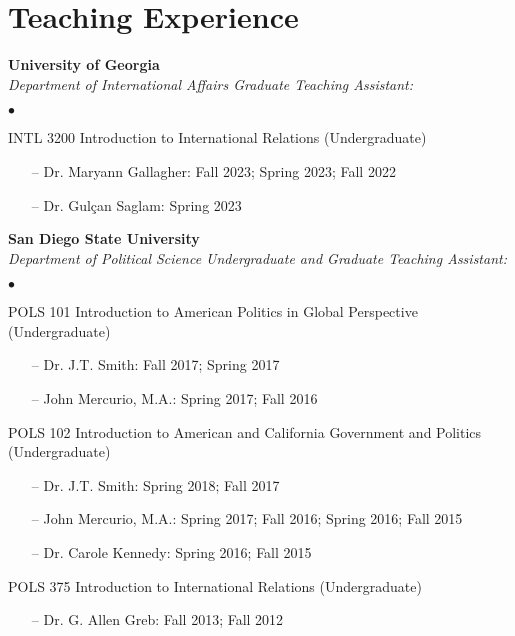 \documentclass[letterpaper,12pt]{article}
\newenvironment{list2}{
  \begin{list}{$\bullet$}{%
      \setlength{\itemsep}{0in}
      \setlength{\parsep}{0in} \setlength{\parskip}{0in}
      \setlength{\topsep}{0in} \setlength{\partopsep}{0in} 
      \setlength{\leftmargin}{0.5in}}}{\end{list}}
\begin{document}
\section{Teaching Experience}
\textbf{University of Georgia}\\
\textit{Department of International Affairs Graduate Teaching Assistant:}
\begin{list2}
    \item INTL 3200 Introduction to International Relations (Undergraduate)
        \begin{itemize}
            \item[--] Dr. Maryann Gallagher: Fall 2023; Spring 2023; Fall 2022
            \item[--] Dr. Gulçan Saglam: Spring 2023
        \end{itemize}
\end{list2}
\par
\textbf{San Diego State University}\\
\textit{Department of Political Science Undergraduate and Graduate Teaching Assistant:}
\begin{list2}
    \item POLS 101 Introduction to American Politics in Global Perspective (Undergraduate)
        \begin{itemize}
            \item[--] Dr. J.T. Smith: Fall 2017; Spring 2017
            \item[--] John Mercurio, M.A.: Spring 2017; Fall 2016
        \end{itemize}
    \item POLS 102 Introduction to American and California Government and Politics (Undergraduate)
        \begin{itemize}
            \item[--] Dr. J.T. Smith: Spring 2018; Fall 2017
            \item[--] John Mercurio, M.A.: Spring 2017; Fall 2016; Spring 2016; Fall 2015
            \item[--] Dr. Carole Kennedy: Spring 2016; Fall 2015
        \end{itemize}
    \item POLS 375 Introduction to International Relations (Undergraduate)
        \begin{itemize}
            \item[--] Dr. G. Allen Greb: Fall 2013; Fall 2012
        \end{itemize}
\end{list2}
\end{document}
